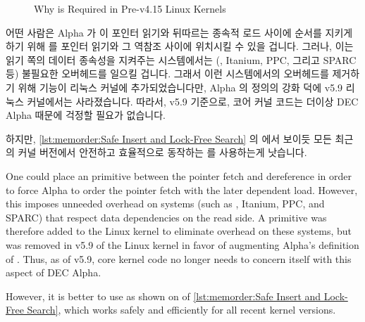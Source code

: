 \begin{figure}[tbp]
\centering
{}
\caption{Why  is Required in Pre-v4.15 Linux Kernels}
\label{fig:memorder:fig:memorder:Why smp-read-barrier-depends() is Required in Pre-v4.15 Linux Kernels}
\end{figure}

어떤 사람은 Alpha 가 이 포인터 읽기와 뒤따르는 종속적 로드 사이에 순서를 지키게
하기 위해  를 포인터 읽기와 그 역참조 사이에 위치시킬 수 있을
겁니다.
그러나, 이는 읽기 쪽의 데이터 종속성을 지켜주는 시스템에서는 (\ARM, Itanium,
PPC, 그리고 SPARC 등) 불필요한 오버헤드를 일으킬 겁니다.
그래서 이런 시스템에서의 오버헤드를 제거하기 위해
 기능이 리눅스 커널에 추가되었습니다만, Alpha 의
 정의의 강화 덕에 v5.9 리눅스 커널에서는 사라졌습니다.
따라서, v5.9 기준으로, 코어 커널 코드는 더이상 DEC Alpha 때문에 걱정할 필요가
없습니다.
\begin{fcvref}
하지만,
\cref{lst:memorder:Safe Insert and Lock-Free Search}
의  에서 보이듯 모든 최근의 커널 버전에서 안전하고
효율적으로 동작하는  를 사용하는게 낫습니다.
\end{fcvref}

\iffalse

One could place an  primitive
between the pointer fetch and dereference in order to force Alpha
to order the pointer fetch with the later dependent load.
However, this imposes unneeded overhead on systems (such as \ARM,
Itanium, PPC, and SPARC) that respect data dependencies on the read side.
A  primitive was therefore added to the
Linux kernel to eliminate overhead on these systems, but was removed
in v5.9 of the Linux kernel in favor of augmenting Alpha's definition
of .
Thus, as of v5.9, core kernel code no longer needs to concern itself
with this aspect of DEC Alpha.
\begin{fcvref}
However, it is better to use 
as shown on  of
\cref{lst:memorder:Safe Insert and Lock-Free Search},
which works safely and efficiently for all recent kernel versions.
\end{fcvref}

